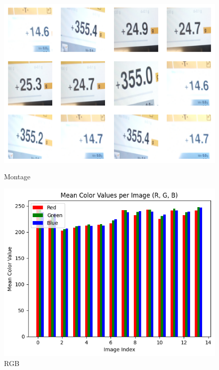 \begin{figure}[ht]
    \centering
    \begin{minipage}[t]{0.25\textwidth}
        \centering
        \includegraphics[width=\textwidth]{Figures/EDA_Charts/11/montage.png}
        \caption*{Montage}
    \end{minipage}\hfill
    \begin{minipage}[t]{0.25\textwidth}
        \centering
        \includegraphics[width=\textwidth]{Figures/EDA_Charts/11/rgb.png}
        \caption*{RGB}
    \end{minipage}\hfill
    \begin{minipage}[t]{0.50\textwidth}
        \centering

\end{minipage}
\end{figure}
